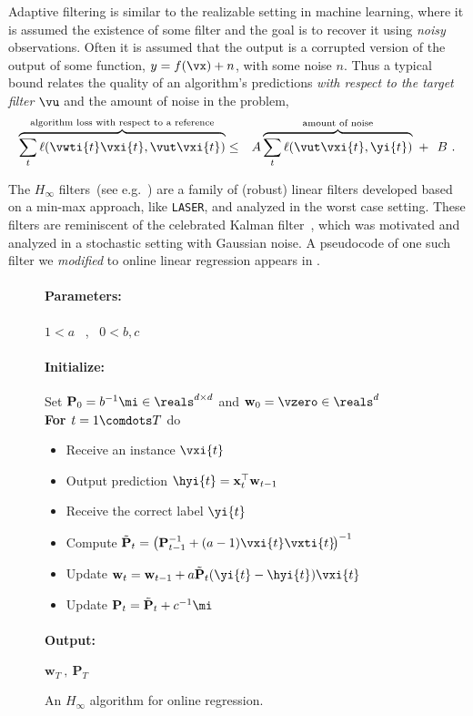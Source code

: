 Adaptive filtering is similar to the realizable setting in machine
learning, where it is assumed the existence of some filter and
the goal is to recover it using {\em noisy} observations. Often it is assumed that the output is a corrupted version of the output
of some function, $y=f(\vx)+n$, with some noise $n$. Thus a
typical bound relates the quality of an algorithm's predictions {\em
  with respect to the target filter} $\vu$ and the amount of noise in the problem,
\begin{align*}
\overbrace{\sum_t
  \ell(\vwti{t}\vxi{t},\vut\vxi{t})}^{\textrm{algorithm loss with
    respect to a reference}} &\leq &
A \overbrace{\sum_t \ell( \vut\vxi{t}, \yi{t})}^{\textrm{amount of
    noise}} ~+~~ B ~.
\end{align*}


The $H_\infty$ filters~(see e.g.~\citep{Simon:2006:OSE:1146304,DBLP:journals/tsp/Simon06})
 are a family of (robust) linear filters developed based on a min-max approach, like \texttt{LASER}, and analyzed in the worst
case setting. These filters are reminiscent of the celebrated Kalman
filter~\citep{Kalman60}, which was motivated and analyzed in a stochastic
setting with Gaussian noise. A pseudocode of one such filter we {\em modified }to online linear
regression appears in .


\begin{figure}[t!]
{
\paragraph{Parameters:} $1<a$ ~,~ $ 0<b,c$
\paragraph{Initialize:} Set
$\mathbf{P}_{0}=b^{-1}\mi\in\reals^{d\times d}$ and $\mathbf{w}_0=\vzero\in\reals^d$\\
{\bf For $t=1 \comdots T$} do
\begin{itemize}
\nolineskips
\item Receive an instance $\vxi{t}$
\item Output  prediction $\hyi{t}=\mathbf{x}_{t}^{\top}\mathbf{w}_{t-1}$
\item Receive the correct label $\yi{t}$
\item Compute $ \tilde{\mathbf{P}}_{t}=\left( \mathbf{P}_{t-1}^{-1}  + (a-1)\vxi{t}\vxti{t}\!\right)^{-1}$
\item
Update $\mathbf{w}_{t}=\mathbf{w}_{t-1} + a\tilde{\mathbf{P}}_{t}
(\yi{t}-\hyi{t}) \vxi{t}$
\item Update $\mathbf{P}_t = \tilde{\mathbf{P}}_t + c^{-1}\mi$
\end{itemize}
\paragraph{Output:}  $\mathbf{w}_{T} \ ,\ \mathbf{P}_{T}$\\
}
\figline
\caption{An $H_\infty$ algorithm for online regression.}
\label{algorithm:hi}
\end{figure}

